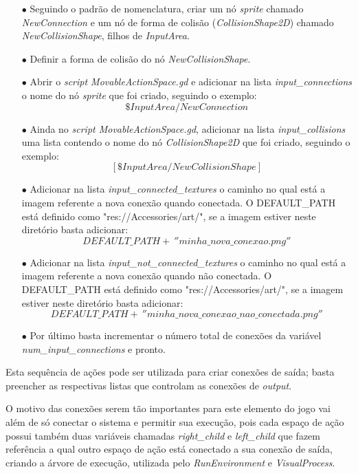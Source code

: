 \begin{itemize}
    \item[$\bullet$]
        Seguindo o padrão de nomenclatura, criar um nó \textit{sprite} chamado
        \textit{NewConnection} e um nó 
        de forma de colisão (\textit{CollisionShape2D}) chamado 
        \textit{NewCollisionShape}, filhos de \textit{InputArea}.
    \item[$\bullet$]
        Definir a forma de colisão do nó \textit{NewCollisionShape}.
    \item[$\bullet$]
        Abrir o \textit{script MovableActionSpace.gd} e adicionar na lista
        \textit{input\_connections} o nome do nó \textit{sprite} que foi criado,
        seguindo o exemplo:
        $$\$InputArea/NewConnection$$
    \item[$\bullet$]
        Ainda no \textit{script MovableActionSpace.gd}, adicionar na lista
        \textit{input\_collisions} uma lista contendo o nome do nó 
        \textit{CollisionShape2D} que foi criado, seguindo o exemplo: 
        $$[\$InputArea/NewCollisionShape]$$
    \item[$\bullet$]
        Adicionar na lista \textit{input\_connected\_textures} o caminho no qual
        está a imagem referente a nova conexão quando conectada.
        O DEFAULT\_PATH está definido como "res://Accessories/art/", se a imagem
        estiver neste diretório basta adicionar:
        $$DEFAULT\_PATH + \ ''minha\_nova\_conexao.png''$$
    \item[$\bullet$]
        Adicionar na lista \textit{input\_not\_connected\_textures} o caminho
        no qual está a imagem referente a nova conexão quando não conectada.
        O DEFAULT\_PATH está definido como "res://Accessories/art/", se a imagem
        estiver neste diretório basta adicionar:
        $$DEFAULT\_PATH + \ ''minha\_nova\_conexao\_nao\_conectada.png''$$
    \item[$\bullet$]
        Por último basta incrementar o número total de conexões da variável
        \textit{num\_input\_connections} e pronto.
\end{itemize}

Esta sequência de ações pode ser utilizada para criar conexões de saída;
basta preencher as respectivas listas que controlam as conexões de 
\textit{output}.

O motivo das conexões serem tão importantes para este elemento do jogo vai além
de só conectar o sistema e permitir sua execução, pois cada espaço de ação 
possui também duas variáveis chamadas \textit{right\_child} 
e \textit{left\_child} que fazem referência a qual outro espaço de ação está 
conectado a sua conexão de saída, criando a árvore de execução, utilizada
pelo \textit{RunEnvironment} e \textit{VisualProcess}.

